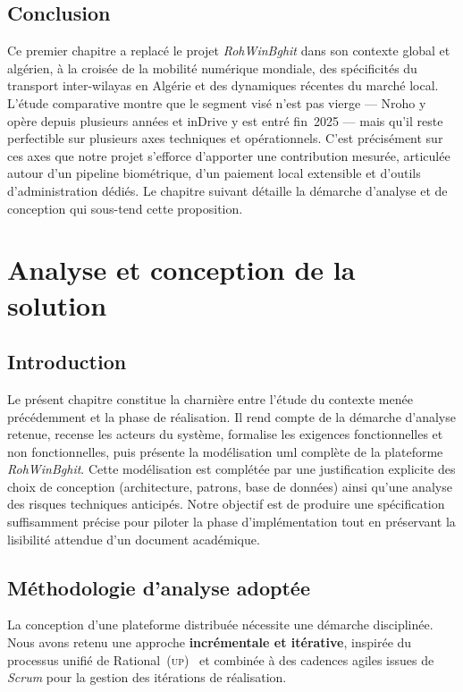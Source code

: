 \documentclass[12pt, a4paper, oneside]{report}
\begin{document}
\section*{Conclusion}

Ce premier chapitre a replacé le projet \textit{RohWinBghit} dans son contexte global et algérien, à la croisée de la mobilité numérique mondiale, des spécificités du transport inter-wilayas en Algérie et des dynamiques récentes du marché local. L'étude comparative montre que le segment visé n'est pas vierge --- Nroho y opère depuis plusieurs années et inDrive y est entré fin~2025 --- mais qu'il reste perfectible sur plusieurs axes techniques et opérationnels. C'est précisément sur ces axes que notre projet s'efforce d'apporter une contribution mesurée, articulée autour d'un pipeline biométrique, d'un paiement local extensible et d'outils d'administration dédiés. Le chapitre suivant détaille la démarche d'analyse et de conception qui sous-tend cette proposition.


\chapter{Analyse et conception de la solution}
\label{chap:conception}

\section*{Introduction}

Le présent chapitre constitue la charnière entre l'étude du contexte menée précédemment et la phase de réalisation. Il rend compte de la démarche d'analyse retenue, recense les acteurs du système, formalise les exigences fonctionnelles et non fonctionnelles, puis présente la modélisation \gls{uml} complète de la plateforme \textit{RohWinBghit}. Cette modélisation est complétée par une justification explicite des choix de conception (architecture, patrons, base de données) ainsi qu'une analyse des risques techniques anticipés. Notre objectif est de produire une spécification suffisamment précise pour piloter la phase d'implémentation tout en préservant la lisibilité attendue d'un document académique.

\section{Méthodologie d'analyse adoptée}
\label{sec:methodologie}

La conception d'une plateforme distribuée nécessite une démarche disciplinée. Nous avons retenu une approche \textbf{incrémentale et itérative}, inspirée du processus unifié de Rational~(\textsc{up})~\cite{kruchten_up_2004} et combinée à des cadences agiles issues de \textit{Scrum} pour la gestion des itérations de réalisation.
\end{document}
